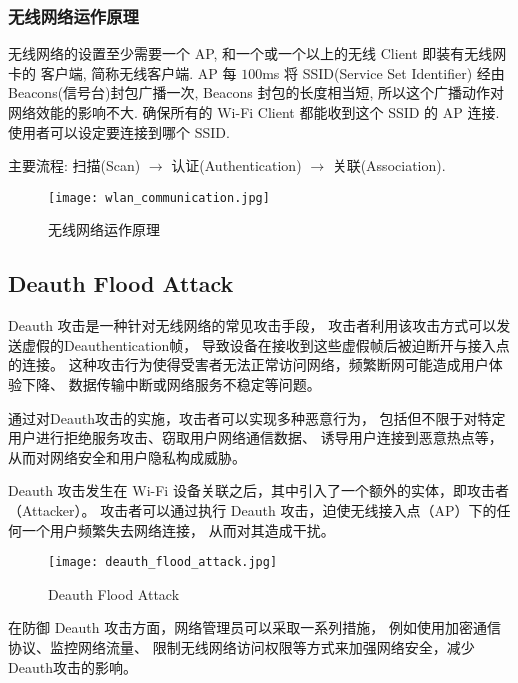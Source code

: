 \documentclass[../main.tex]{subfiles}
\begin{document}
\subsubsection*{无线网络运作原理}
无线网络的设置至少需要一个 AP, 和一个或一个以上的无线 Client 即装有无线网卡的
客户端, 简称无线客户端. AP 每 $ 100 $ms 将 SSID(Service Set Identifier) 经由
Beacons(信号台)封包广播一次, Beacons 封包的长度相当短,
所以这个广播动作对网络效能的影响不大. 确保所有的 Wi-Fi Client 都能收到这个 SSID
的 AP 连接. 使用者可以设定要连接到哪个 SSID.

主要流程: 扫描(Scan) $ \rightarrow $ 认证(Authentication) $ \rightarrow $
关联(Association).

\begin{figure}[H]
  \begin{center}
    \texttt{[image: wlan\_communication.jpg]}
  \end{center}
  \caption{无线网络运作原理}
\end{figure}
%
\subsection{Deauth Flood Attack}
Deauth 攻击是一种针对无线网络的常见攻击手段，
攻击者利用该攻击方式可以发送虚假的Deauthentication帧，
导致设备在接收到这些虚假帧后被迫断开与接入点的连接。
这种攻击行为使得受害者无法正常访问网络，频繁断网可能造成用户体验下降、
数据传输中断或网络服务不稳定等问题。

通过对Deauth攻击的实施，攻击者可以实现多种恶意行为，
包括但不限于对特定用户进行拒绝服务攻击、窃取用户网络通信数据、
诱导用户连接到恶意热点等，从而对网络安全和用户隐私构成威胁。

Deauth 攻击发生在 Wi-Fi 设备关联之后，其中引入了一个额外的实体，即攻击者（Attacker）。
攻击者可以通过执行 Deauth 攻击，迫使无线接入点（AP）下的任何一个用户频繁失去网络连接，
从而对其造成干扰。

\begin{figure}[H]
  \begin{center}
    \texttt{[image: deauth\_flood\_attack.jpg]}
  \end{center}
  \caption{Deauth Flood Attack}
\end{figure}

在防御 Deauth 攻击方面，网络管理员可以采取一系列措施，
例如使用加密通信协议、监控网络流量、
限制无线网络访问权限等方式来加强网络安全，减少Deauth攻击的影响。
\end{document}
